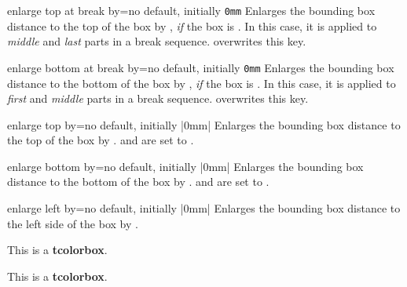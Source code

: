 \clearpage


\begin{docTcbKey}{enlarge top at break by}{=}{no default, initially \texttt{0mm}}
  Enlarges the bounding box distance to the top of the box by ,
  \emph{if} the box is .
  In this case, it is applied to \emph{middle} and \emph{last} parts in a
  break sequence.
   overwrites this key.
\end{docTcbKey}


\begin{docTcbKey}{enlarge bottom at break by}{=}{no default, initially \texttt{0mm}}
  Enlarges the bounding box distance to the bottom of the box by ,
  \emph{if} the box is .
  In this case, it is applied to \emph{first} and \emph{middle} parts in a
  break sequence.  overwrites this key.
\end{docTcbKey}


\begin{docTcbKey}{enlarge top by}{=}{no default, initially |0mm|}
  Enlarges the bounding box distance to the top of the box by .
   and
   are set to .
\end{docTcbKey}


\begin{docTcbKey}{enlarge bottom by}{=}{no default, initially |0mm|}
  Enlarges the bounding box distance to the bottom of the box by .
   and
   are set to .
\end{docTcbKey}


\begin{docTcbKey}{enlarge left by}{=}{no default, initially |0mm|}
  Enlarges the bounding box distance to the left side of the box by .
\begin{dispExample}

\begin{tcolorbox}[enlarge left by=2cm,width=5cm,enhanced,show bounding box]
This is a \textbf{tcolorbox}.
\end{tcolorbox}
\begin{tcolorbox}[enlarge left by=-2cm,width=\linewidth+2cm]
This is a \textbf{tcolorbox}.
\end{tcolorbox}
\end{dispExample}
\end{docTcbKey}

